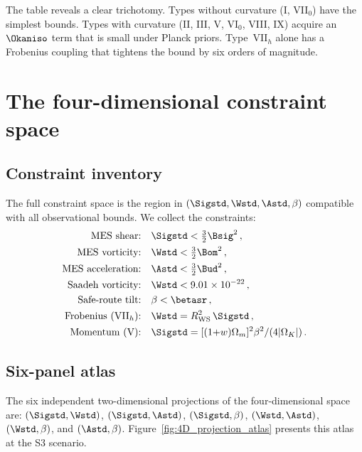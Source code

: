 The table reveals a clear trichotomy.  Types without curvature
(I, VII$_0$) have the simplest bounds.  Types with curvature
(II, III, V, VI$_0$, VIII, IX) acquire an $\Okaniso$ term
that is small under Planck priors.  Type~VII$_h$ alone has a
Frobenius coupling that tightens the bound by six orders of
magnitude.


\section{The four-dimensional constraint space}
\label{sec:4D}

\subsection{Constraint inventory}\label{sec:constraint-inventory}

The full constraint space is the region in
$(\Sigstd, \Wstd, \Astd, \beta)$ compatible with all
observational bounds.  We collect the constraints:
\begin{equation}\label{eq:constraint-inventory}
\begin{aligned}
\text{MES shear:} &\quad \Sigstd < \tfrac{3}{2}\Bsig^2\,,\\
\text{MES vorticity:} &\quad \Wstd < \tfrac{3}{2}\Bom^2\,,\\
\text{MES acceleration:} &\quad \Astd < \tfrac{3}{2}\Bud^2\,,\\
\text{Saadeh vorticity:} &\quad \Wstd < 9.01 \times 10^{-22}\,,\\
\text{Safe-route tilt:} &\quad \beta < \betasr\,,\\
\text{Frobenius (VII$_h$):} &\quad
  \Wstd = R_{\mathrm{WS}}^2\,\Sigstd\,,\\
\text{Momentum (V):} &\quad
  \Sigstd = [(1{+}w)\Omega_m]^2\beta^2/(4|\Omega_K|)\,.
\end{aligned}
\end{equation}


\subsection{Six-panel atlas}\label{sec:atlas}

The six independent two-dimensional projections of the
four-dimensional space are:
$(\Sigstd, \Wstd)$, $(\Sigstd, \Astd)$, $(\Sigstd, \beta)$,
$(\Wstd, \Astd)$, $(\Wstd, \beta)$, and $(\Astd, \beta)$.
Figure~\ref{fig:4D_projection_atlas} presents this atlas at the
S3 scenario.

